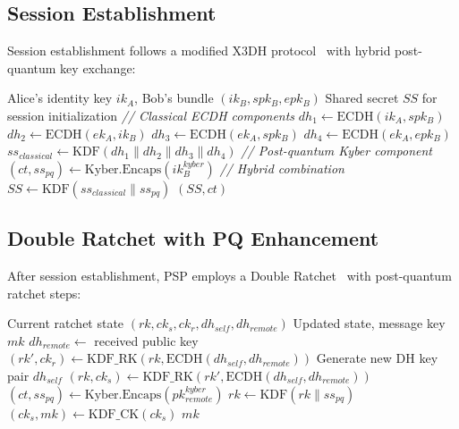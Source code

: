 \documentclass[11pt,a4paper]{article}
\begin{document}
\subsection{Session Establishment}

Session establishment follows a modified X3DH protocol~\cite{marlinspike2016x3dh} with hybrid post-quantum key exchange:

\begin{algorithm}[H]
\caption{Hybrid X3DH Session Establishment}
\label{alg:x3dh}
\begin{algorithmic}[1]
\Require Alice's identity key $ik_A$, Bob's bundle $(ik_B, spk_B, epk_B)$
\Ensure Shared secret $SS$ for session initialization
\State \textit{// Classical ECDH components}
\State $dh_1 \gets \text{ECDH}(ik_A, spk_B)$
\State $dh_2 \gets \text{ECDH}(ek_A, ik_B)$
\State $dh_3 \gets \text{ECDH}(ek_A, spk_B)$
\State $dh_4 \gets \text{ECDH}(ek_A, epk_B)$
\State $ss_{classical} \gets \text{KDF}(dh_1 \| dh_2 \| dh_3 \| dh_4)$
\State \textit{// Post-quantum Kyber component}
\State $(ct, ss_{pq}) \gets \text{Kyber.Encaps}(ik_B^{kyber})$
\State \textit{// Hybrid combination}
\State $SS \gets \text{KDF}(ss_{classical} \| ss_{pq})$
\State \Return $(SS, ct)$
\end{algorithmic}
\end{algorithm}

\subsection{Double Ratchet with PQ Enhancement}

After session establishment, PSP employs a Double Ratchet~\cite{cohn2020formal} with post-quantum ratchet steps:

\begin{algorithm}[H]
\caption{PQ-Enhanced Double Ratchet Step}
\label{alg:ratchet}
\begin{algorithmic}[1]
\Require Current ratchet state $(rk, ck_s, ck_r, dh_{self}, dh_{remote})$
\Ensure Updated state, message key $mk$
    \State $dh_{remote} \gets$ received public key
    \State $(rk', ck_r) \gets \text{KDF\_RK}(rk, \text{ECDH}(dh_{self}, dh_{remote}))$
    \State Generate new DH key pair $dh_{self}$
    \State $(rk, ck_s) \gets \text{KDF\_RK}(rk', \text{ECDH}(dh_{self}, dh_{remote}))$
     
        \State $(ct, ss_{pq}) \gets \text{Kyber.Encaps}(pk_{remote}^{kyber})$
        \State $rk \gets \text{KDF}(rk \| ss_{pq})$
    \EndIf
\EndIf
\State $(ck_s, mk) \gets \text{KDF\_CK}(ck_s)$
\State \Return $mk$
\end{algorithmic}
\end{algorithm}
\end{document}
